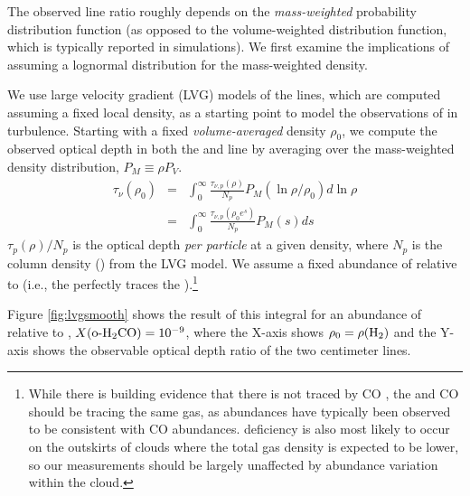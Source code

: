The observed \formaldehyde line ratio roughly depends on the \emph{mass-weighted}
probability distribution function (as opposed to the volume-weighted
distribution function, which is typically reported in simulations).  We first
examine the implications of assuming a lognormal distribution for the
mass-weighted density.

We use large velocity gradient (LVG) models of the \formaldehyde lines, which are computed assuming a
fixed local density, as a starting point to model the observations of
\formaldehyde in turbulence.   Starting with a fixed \emph{volume-averaged}
density $\rho_0$, we compute the observed \formaldehyde optical depth in both
the \oneone and \twotwo
line by averaging over the mass-weighted density distribution, $P_M\equiv\rho P_V$.
\begin{eqnarray}
    \label{eqn:tauintegral}
    \tau_{\nu}(\rho_0) &=& \int_{0}^\infty \frac{\tau_{\nu,p}(\rho)}{N_p} P_M(\ln \rho/\rho_0) d \ln \rho\\
                       &=& \int_{0}^\infty \frac{\tau_{\nu,p}(\rho_0 e^s)}{N_p} P_M(s) d s
\end{eqnarray} %
$\tau_p(\rho)/N_p$ is the optical depth \emph{per particle} at a given density, where $N_p$ is the column
density (\perkmspc) from the LVG model.
We assume a fixed abundance of \ortho relative to \hh
(i.e., the \formaldehyde perfectly traces the \hh).\footnote{While there is
building evidence that there is \hh not traced by CO
\citep{Shetty2011b,Shetty2011a}, the \formaldehyde and CO should be tracing the
same gas, as \formaldehyde abundances have typically been observed to be
consistent with CO abundances.  \formaldehyde deficiency is also most likely to
occur on the outskirts of clouds where the total gas density is expected to be
lower, so our measurements should be largely unaffected by abundance variation
within the cloud.}

Figure \ref{fig:lvgsmooth}
shows the result of this integral for an abundance of \ortho relative to \hh, 
$X(\textrm{o-H}_2\textrm{CO})=10^{-9}$, where the X-axis shows $\rho_0 = \rho(\textrm{H}_{2})$ and the Y-axis
shows the observable optical depth ratio of the two \formaldehyde centimeter
lines.

